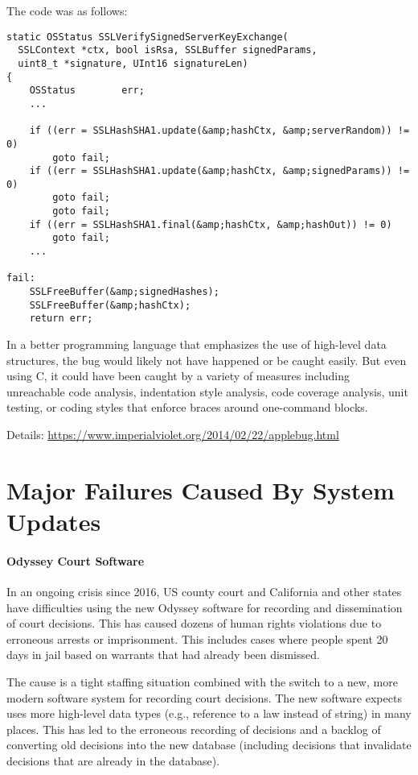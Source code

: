 The code was as follows:

\begin{lstlisting}
static OSStatus SSLVerifySignedServerKeyExchange(
  SSLContext *ctx, bool isRsa, SSLBuffer signedParams,
  uint8_t *signature, UInt16 signatureLen)
{
	OSStatus        err;
	...

	if ((err = SSLHashSHA1.update(&amp;hashCtx, &amp;serverRandom)) != 0)
		goto fail;
	if ((err = SSLHashSHA1.update(&amp;hashCtx, &amp;signedParams)) != 0)
		goto fail;
		goto fail;
	if ((err = SSLHashSHA1.final(&amp;hashCtx, &amp;hashOut)) != 0)
		goto fail;
	...

fail:
	SSLFreeBuffer(&amp;signedHashes);
	SSLFreeBuffer(&amp;hashCtx);
	return err;
\end{lstlisting}

In a better programming language that emphasizes the use of high-level data structures, the bug would likely not have happened or be caught easily.
But even using C, it could have been caught by a variety of measures including unreachable code analysis, indentation style analysis, code coverage analysis, unit testing, or coding styles that enforce braces around one-command blocks.
 
Details: \url{https://www.imperialviolet.org/2014/02/22/applebug.html}


\section{Major Failures Caused By System Updates}

\paragraph{Odyssey Court Software}
In an ongoing crisis since 2016, US county court and California and other states have difficulties using the new Odyssey software for recording and dissemination of court decisions.
This has caused dozens of human rights violations due to erroneous arrests or imprisonment.
This includes cases where people spent 20 days in jail based on warrants that had already been dismissed.

The cause is a tight staffing situation combined with the switch to a new, more modern software system for recording court decisions.
The new software expects uses more high-level data types (e.g., reference to a law instead of string) in many places.
This has led to the erroneous recording of decisions and a backlog of converting old decisions into the new database (including decisions that invalidate decisions that are already in the database).


